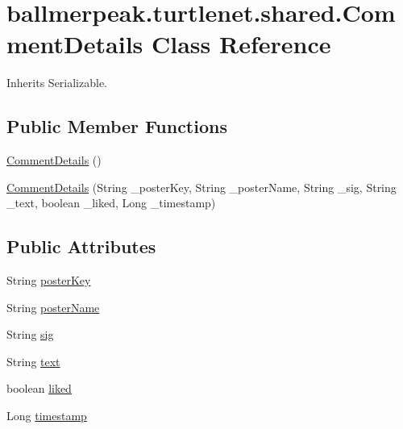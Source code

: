 \hypertarget{classballmerpeak_1_1turtlenet_1_1shared_1_1CommentDetails}{\section{ballmerpeak.\-turtlenet.\-shared.\-Comment\-Details Class Reference}
\label{classballmerpeak_1_1turtlenet_1_1shared_1_1CommentDetails}
}


Inherits Serializable.

\subsection*{Public Member Functions}
\begin{DoxyCompactItemize}
\item 
\hyperlink{classballmerpeak_1_1turtlenet_1_1shared_1_1CommentDetails_a423ee072cece507d02cbc57f41152aa2}{Comment\-Details} ()
\item 
\hyperlink{classballmerpeak_1_1turtlenet_1_1shared_1_1CommentDetails_aea01f179b2be192bdbf1c78035fd13ea}{Comment\-Details} (String \-\_\-poster\-Key, String \-\_\-poster\-Name, String \-\_\-sig, String \-\_\-text, boolean \-\_\-liked, Long \-\_\-timestamp)
\end{DoxyCompactItemize}
\subsection*{Public Attributes}
\begin{DoxyCompactItemize}
\item 
String \hyperlink{classballmerpeak_1_1turtlenet_1_1shared_1_1CommentDetails_a018d0738dd22703504c33b3bb6f8871a}{poster\-Key}
\item 
String \hyperlink{classballmerpeak_1_1turtlenet_1_1shared_1_1CommentDetails_a0feb9ab9c020b33ca5053ae2d6992b44}{poster\-Name}
\item 
String \hyperlink{classballmerpeak_1_1turtlenet_1_1shared_1_1CommentDetails_a6512dd32f4aab495d61c7592e8e38583}{sig}
\item 
String \hyperlink{classballmerpeak_1_1turtlenet_1_1shared_1_1CommentDetails_a4aa59661e2b3ef7c1a3d25e38c53d7bf}{text}
\item 
boolean \hyperlink{classballmerpeak_1_1turtlenet_1_1shared_1_1CommentDetails_a7aa48bc7182ff337eba405d2d7bb053f}{liked}
\item 
Long \hyperlink{classballmerpeak_1_1turtlenet_1_1shared_1_1CommentDetails_a8ac94ee627e504421f05caf66e592aff}{timestamp}
\end{DoxyCompactItemize}


